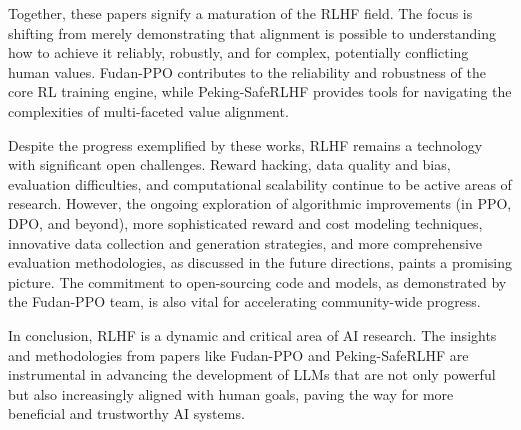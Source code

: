 \documentclass[10pt,journal,compsoc]{IEEEtran} %
\begin{document}
Together, these papers signify a maturation of the RLHF field. The focus is shifting from merely demonstrating that alignment is possible to understanding how to achieve it reliably, robustly, and for complex, potentially conflicting human values. Fudan-PPO contributes to the reliability and robustness of the core RL training engine, while Peking-SafeRLHF provides tools for navigating the complexities of multi-faceted value alignment.

Despite the progress exemplified by these works, RLHF remains a technology with significant open challenges. Reward hacking, data quality and bias, evaluation difficulties, and computational scalability continue to be active areas of research. However, the ongoing exploration of algorithmic improvements (in PPO, DPO, and beyond), more sophisticated reward and cost modeling techniques, innovative data collection and generation strategies, and more comprehensive evaluation methodologies, as discussed in the future directions, paints a promising picture. The commitment to open-sourcing code and models, as demonstrated by the Fudan-PPO team, is also vital for accelerating community-wide progress.  

In conclusion, RLHF is a dynamic and critical area of AI research. The insights and methodologies from papers like Fudan-PPO and Peking-SafeRLHF are instrumental in advancing the development of LLMs that are not only powerful but also increasingly aligned with human goals, paving the way for more beneficial and trustworthy AI systems.


\end{document}
